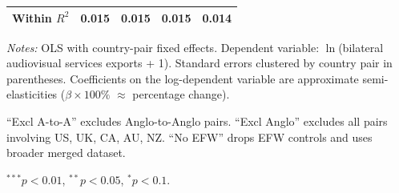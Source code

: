 \begin{table}[htbp]
\begin{tabular}{l cccc}
Within $R^2$ & 0.015 & 0.015 & 0.015 & 0.014 \\
\bottomrule
\end{tabular}
\par\vspace{4pt}\noindent\begin{minipage}{\textwidth}
\footnotesize
\par \textit{Notes:} OLS with country-pair fixed effects. Dependent variable: $\ln$(bilateral audiovisual services exports + 1). Standard errors clustered by country pair in parentheses. Coefficients on the log-dependent variable are approximate semi-elasticities ($\beta \times 100\%$ $\approx$ percentage change).
\par ``Excl A-to-A'' excludes Anglo-to-Anglo pairs. ``Excl Anglo'' excludes all pairs involving US, UK, CA, AU, NZ. ``No EFW'' drops EFW controls and uses broader merged dataset.
\par $^{***}p<0.01$, $^{**}p<0.05$, $^{*}p<0.1$.
\end{minipage}
\end{table}

\clearpage


